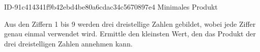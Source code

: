 \begin{exercise}
      {ID-91c414341f9b42ebd4be80a6cdac34c5670897e4}
      {Minimales Produkt}
  \ifproblem\problem\par
    Aus den Ziffern 1 bis 9 werden drei dreistellige Zahlen gebildet, wobei
    jede Ziffer genau einmal verwendet wird. Ermittle den kleinsten Wert,
    den das Produkt der drei dreistelligen Zahlen annehmen kann.
  \fi
\end{exercise}
